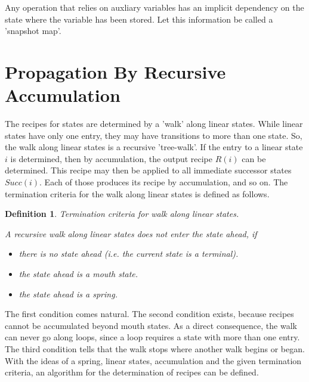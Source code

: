 \documentclass[12pt,a4paper]{scrartcl}
\newtheorem{definition}{Definition}
\begin{document}
Any operation that relies on auxliary variables has an implicit dependency
on the state where the variable has been stored. Let this information be
called a 'snapshot map'.

%
\section{Propagation By Recursive Accumulation}

The recipes for states are determined by a 'walk' along linear states. While
linear states have only one entry, they may have transitions to more than one
state. So, the walk along linear states is a recursive 'tree-walk'. If the
entry to a linear state $i$ is determined, then by accumulation, the output
recipe $R(i)$ can be determined. This recipe may then be applied to all
immediate successor states $Succ(i)$. Each of those produces its recipe by
accumulation, and so on. The termination criteria for the walk along linear
states is defined as follows.

\begin{definition}
Termination criteria for walk along linear states.

A recursive walk along linear states does not enter the state ahead, if 

\begin{itemize}
    \item there is no state ahead (i.e. the current state is a terminal).
    \item the state ahead is a mouth state.
    \item the state ahead is a spring.
\end{itemize}
\end{definition}

The first condition comes natural. The second condition exists, because recipes
cannot be accumulated beyond mouth states. As a direct consequence, the walk
can never go along loops, since a loop requires a state with more than one
entry. The third condition tells that the walk stops where another walk begins
or began.  With the ideas of a spring, linear states, accumulation and the
given termination criteria, an algorithm for the determination of recipes can
be defined.
\end{document}

